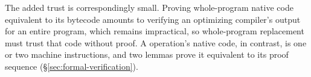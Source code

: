 The added trust is correspondingly small.
Proving whole-program native code equivalent to its bytecode amounts to verifying an optimizing compiler's output for an entire program, which remains impractical, so whole-program replacement must trust that code without proof.
A \lang operation's native code, in contrast, is one or two machine instructions, and two lemmas prove it equivalent to its proof sequence (\S\ref{sec:formal-verification}).
